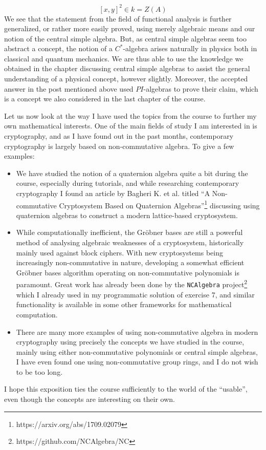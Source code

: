 \documentclass[a4paper, 12pt]{article}
\begin{document}
\begin{Exercise}
\begin{itemize}
            \[
                [x, y]^2 \in k = Z(A)
            \]
            We see that the statement from the field of functional analysis is further generalized, or rather more easily proved, using merely algebraic means and our notion of the central simple algebra.
            But, as central simple algebras seem too abstract a concept, the notion of a $C^*$-algebra arises naturally in physics both in classical and quantum mechanics.
            We are thus able to use the knowledge we obtained in the chapter discussing central simple algebras to assist the general understanding of a physical concept, however slightly.
            Moreover, the accepted answer in the post mentioned above used $PI$-algebras to prove their claim, which is a concept we also considered in the last chapter of the course.
    \end{itemize}
    Let us now look at the way I have used the topics from the course to further my own mathematical interests.
    One of the main fields of study I am interested in is cryptography, and as I have found out in the past months, contemporary cryptography is largely based on non-commutative algebra.
    To give a few examples:
    \begin{itemize}
        \item
            We have studied the notion of a quaternion algebra quite a bit during the course, especially during tutorials,
            and while researching contemporary cryptography I found an article by Bagheri K. et al. titled ``A Non-commutative Cryptosystem Based on Quaternion Algebras''\footnote{https://arxiv.org/abs/1709.02079} discussing using quaternion algebras to construct a modern lattice-based cryptosystem.
        \item
            While computationally inefficient, the Gr\"obner bases are still a powerful method of analysing algebraic weaknesses of a cryptosystem, historically mainly used against block ciphers.
            With new cryptosystems being increasingly non-commutative in nature, developing a somewhat efficient Gr\"obner bases algorithm operating on non-commutative polynomials is paramount.
            Great work has already been done by the \texttt{NCAlgebra} project\footnote{https://github.com/NCAlgebra/NC} which I already used in my programmatic solution of exercise 7,
            and similar functionality is available in some other frameworks for mathematical computation.
        \item
            There are many more examples of using non-commutative algebra in modern cryptography using precisely the concepts we have studied in the course,
            mainly using either non-commutative polynomials or central simple algebras, I have even found one using non-commutative group rings,
            and I do not wish to be too long.
    \end{itemize}
    I hope this exposition ties the course sufficiently to the world of the ``usable'', even though the concepts are interesting on their own.
\end{Exercise}
\end{document}
